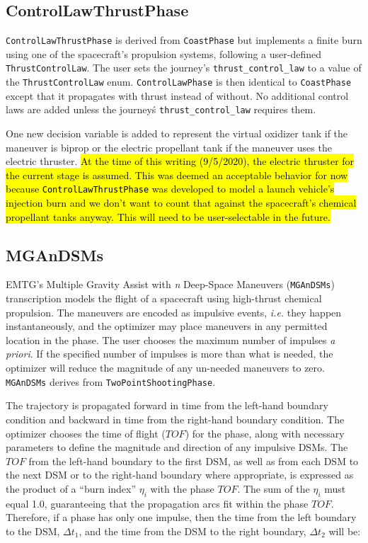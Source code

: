 \subsection{ControlLawThrustPhase}
\label{subsec:controlLawThrustPhase}

\texttt{ControlLawThrustPhase} is derived from \texttt{CoastPhase} but implements a finite burn using one of the spacecraft's propulsion systems, following a user-defined \texttt{ThrustControlLaw}. The user sets the journey's \texttt{thrust\_control\_law} to a value of the \texttt{ThrustControlLaw} enum. \texttt{ControlLawPhase} is then identical to \texttt{CoastPhase} except that it propagates with thrust instead of without. No additional control laws are added unless the journey\'s \texttt{thrust\_control\_law} requires them.

One new decision variable is added to represent the virtual oxidizer tank if the maneuver is biprop or the electric propellant tank if the maneuver uses the electric thruster. \hl{At the time of this writing (9/5/2020), the electric thruster for the current stage is assumed. This was deemed an acceptable behavior for now because \texttt{ControlLawThrustPhase} was developed to model a launch vehicle's injection burn and we don't want to count that against the spacecraft's chemical propellant tanks anyway. This will need to be user-selectable in the future.}

\subsection{MGAnDSMs}
\label{subsec:MGAnDSMs}

\ac{EMTG}'s Multiple Gravity Assist with \textit{n} Deep-Space Maneuvers (\texttt{MGAnDSMs}) transcription models the flight of a spacecraft using high-thrust chemical propulsion. The maneuvers are encoded as impulsive events, \textit{i.e.} they happen instantaneously, and the optimizer may place maneuvers in any permitted location in the phase. The user chooses the maximum number of impulses \textit{a priori}. If the specified number of impulses is more than what is needed, the optimizer will reduce the magnitude of any un-needed maneuvers to zero. \texttt{MGAnDSMs} derives from \texttt{TwoPointShootingPhase}.

The trajectory is propagated forward in time from the left-hand boundary condition and backward in time from the right-hand boundary condition. The optimizer chooses the time of flight ($TOF$) for the phase, along with necessary parameters to define the magnitude and direction of any impulsive \ac{DSM}s. The $TOF$ from the left-hand boundary to the first \ac{DSM}, as well as from each \ac{DSM} to the next \ac{DSM} or to the right-hand boundary where appropriate, is expressed as the product of a ``burn index'' $\eta_i$ with the phase $TOF$. The sum of the $\eta_i$ must equal 1.0, guaranteeing that the propagation arcs fit within the phase $TOF$. Therefore, if a phase has only one impulse, then the time from the left boundary to the \ac{DSM}, $\Delta t_1$, and the time from the DSM to the right boundary, $\Delta t_2$ will be:

